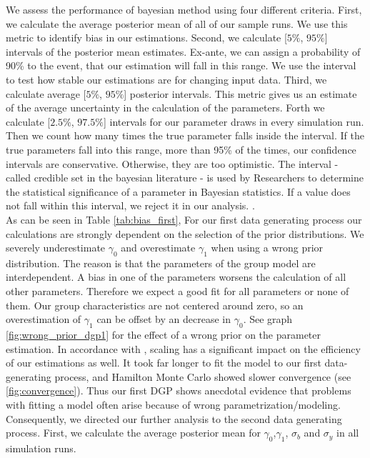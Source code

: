 We assess the performance of bayesian method using four different criteria.
First, we calculate the average posterior mean of all of our sample runs. We use this metric to identify bias in our estimations. 
Second, we calculate [$5\text{\%}$, $95\text{\%}$] intervals of the posterior mean estimates. Ex-ante, we can assign a probability of 90\% to the event, that our estimation will fall in this range. We use the interval to test how stable our estimations are for changing input data. 
Third, we calculate average [$5\text{\%}$, $95\text{\%}$] posterior intervals. This metric gives us an estimate of the average uncertainty in the calculation of the parameters.
Forth we calculate [$2.5\text{\%}$, $97.5\text{\%}$] intervals for our parameter draws in every simulation run. Then we count how many times the true parameter falls inside the interval. If the true parameters fall into this range, more than 95\% of the times, our confidence intervals are conservative. Otherwise, they are too optimistic. The interval - called credible set in the bayesian literature - is used by Researchers to determine the statistical significance of a parameter in Bayesian statistics. If a value does not fall within this interval, we reject it in our analysis. \cite{koop2003}.\\
As can be seen in Table  \ref{tab:bias_first}, For our first data generating process our calculations are strongly dependent on the selection of the prior distributions. We severely underestimate $\gamma_0$ and overestimate $\gamma_1$ when using a wrong prior distribution. The reason is that the parameters of the group model are interdependent. A bias in one of the parameters worsens the calculation of all other parameters.  Therefore we expect a good fit for all parameters or none of them. Our group characteristics are not centered around zero, so an overestimation of $\gamma_1$  can be offset by an decrease in $\gamma_0$. See graph \ref{fig:wrong_prior_dgp1} for the effect of a wrong prior on the parameter estimation.
In accordance with \cite{gelman2008weakly}, scaling has a significant impact on the efficiency of our estimations as well. 
It took far longer to fit the model to our first data-generating process, and Hamilton Monte Carlo showed slower convergence (see \ref{fig:convergence}). Thus our first DGP shows anecdotal evidence that problems with fitting a model often arise because of wrong parametrization/modeling.\\
Consequently, we directed our further analysis to the second data generating process.
First, we calculate the average posterior mean for $\gamma_0$,$\gamma_1$, $\sigma_b $ and $\sigma_y$ in all simulation runs.
